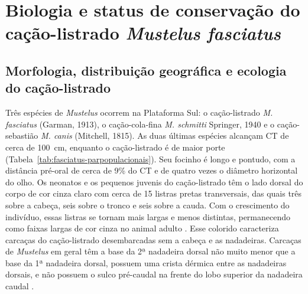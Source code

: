 \documentclass[a4paper,11pt,twoside,showtrims,onecolumn,openright,final]{memoir}
\begin{document}

\chapter[Biologia e status de conservação do cação-listrado \mbox{\emph{Mustelus fasciatus}}]
        {Biologia e status de conservação do cação-listrado \emph{Mustelus fasciatus}}\label{chap:fasciatus}




\newpage

\section*{Morfologia, distribuição geográfica e ecologia do cação-listrado}

Três espécies de \emph{Mustelus} ocorrem na Plataforma Sul: o cação-listrado \emph{M. fasciatus} (Garman, 1913), 
o cação-cola-fina \emph{M. schmitti} Springer, 1940 e o cação-sebastião \emph{M. canis} (Mitchell, 1815). 
As duas últimas espécies alcançam CT de cerca de 100~cm, enquanto o cação-listrado é de maior porte (Tabela~\ref{tab:fasciatus-parpopulacionais}). 
Seu focinho é longo e pontudo, com a distância pré-oral de cerca de 9\% do CT e de quatro vezes o diâmetro 
horizontal do olho. Os neonatos e os pequenos juvenis do cação-listrado têm o lado dorsal do corpo de cor 
cinza claro com cerca de 15 listras pretas transversais, das quais três sobre a cabeça, seis sobre o 
tronco e seis sobre a cauda. Com o crescimento do indivíduo, essas listras se tornam mais largas e menos 
distintas, permanecendo como faixas largas de cor cinza no animal adulto 
\citep[Foto na página \pageref{chap:fasciatus}, Figura~\ref{fig:fasciatus-fotografias}]{bigelow1948,FIGUEIREDO1977}. %
Esse colorido caracteriza carcaças do cação-listrado desembarcadas sem a cabeça e as nadadeiras. 
Carcaças de \emph{Mustelus} em geral têm a base da 2ª nadadeira dorsal não muito menor que a base 
da 1ª nadadeira dorsal,  possuem uma crista dérmica entre as nadadeiras dorsais, e não possuem 
o sulco pré-caudal na frente do lobo superior da nadadeira caudal \citep{vooren2003}. %
\end{document}
